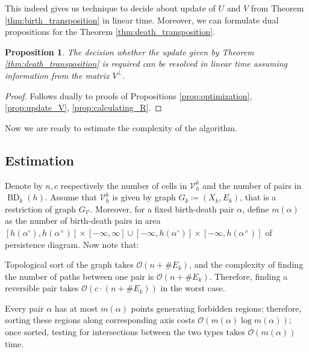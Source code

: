 \documentclass[a4paper,12pt, USenglish,cleveref,autoref,thm-restate]{article}
\newtheorem{proposition}[theorem]{Proposition}
\newcommand{\mf}{h}
\DeclareMathOperator{\bd}{BD}
\newcommand{\mU}{U}
\newcommand{\mV}{V}
\newcommand{\bth}[1]{#1^\circ}
\newcommand{\dth}[1]{#1^{\!\times}}
\newcommand{\bds}{\alpha}
\newcommand{\cV}{\mathcal{V}}
\def\card#1{\##1}
\begin{document}
\begin{appendices}
\noindent This indeed gives us technique to decide about update of $\mU$ and $\mV$ from Theorem \ref{thm:birth_transposition} in linear time. Moreover, we can formulate dual propositions for the Theorem \ref{thm:death_transposition}.

\begin{proposition}\label{prop:optimization2}
The decision whether the update given by Theorem \ref{thm:death_transposition} is required can be resolved in linear time assuming information from the matrix $\mV^{\perp}$.
\end{proposition}

\begin{proof}
    Follows dually to proofs of Propositions \ref{prop:optimization}, \ref{prop:update_V}, \ref{prop:calculating_R}.
\end{proof}


\noindent Now we are ready to estimate the complexity of the algorithm.

\subsection{Estimation}

\noindent Denote by $n,c$ respectively the number of cells in $\cV^{k}_{\mf}$ and the number of pairs in $\bd_{k}(h)$. 
  Assume that $\cV^{k}_{h}$ is given by graph $G_k\coloneqq(X_{k},E_{k})$, that is a restriction of graph $G_\cV$. 
  Moreover, for a fixed birth-death pair $\bds$, define $m(\bds)$ as the number of birth-death pairs in area $[\mf(\bth\bds),\mf(\dth\bds)] \times [-\infty,\infty] \cup [-\infty,\mf(\bth\bds)]\times[-\infty,\mf(\dth\bds)]$ of persistence diagram. Now note that:

\begin{bracketenumerate}
    
 

    \item Topological sort of the graph takes $\mathcal{O}(n + \card{E_{k}})$, and 
        the complexity of finding the number of paths between one pair is $\mathcal{O}(n+\card{E_k})$. 
        Therefore, finding a reversible pair takes  $\mathcal{O}(c \cdot (n+\card{E_k}))$ in the worst case. 

    \item Every pair $\bds$ has at most $m(\bds)$ points generating forbidden regions; 
        therefore, sorting these regions along corresponding axis costs $\mathcal{O}(m(\bds)\log m(\bds))$; once sorted, testing for intersections between the two types takes $\mathcal{O}(m(\bds))$ time. 


\end{bracketenumerate}
\end{appendices}
\end{document}
